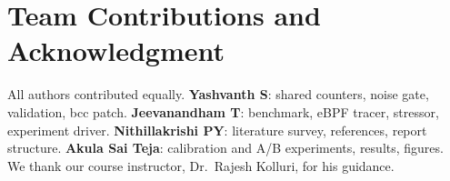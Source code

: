 \section*{Team Contributions and Acknowledgment}
All authors contributed equally. \textbf{Yashvanth S}: shared counters,
noise gate, validation, bcc patch. \textbf{Jeevanandham T}: benchmark, eBPF
tracer, stressor, experiment driver. \textbf{Nithillakrishi PY}: literature
survey, references, report structure. \textbf{Akula Sai Teja}: calibration
and A/B experiments, results, figures. We thank our course instructor, Dr.\ Rajesh Kolluri, for his guidance.
